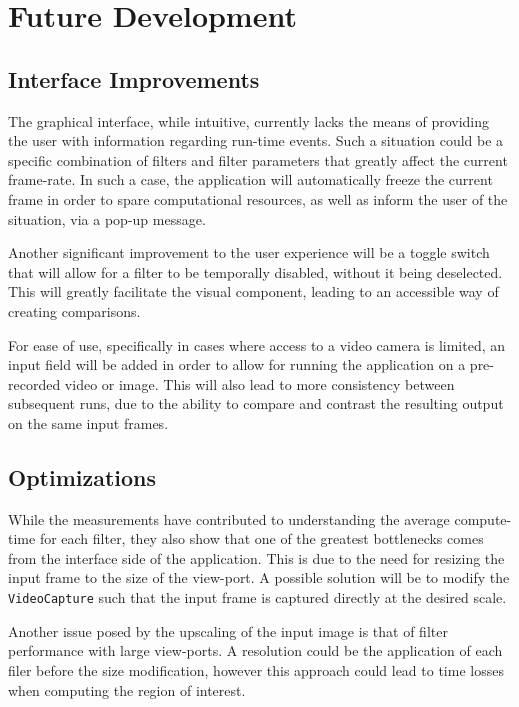 \section{Future Development}

\subsection{Interface Improvements}

The graphical interface, while intuitive, currently lacks the means of providing the user with information
regarding run-time events. Such a situation could be a specific combination of filters and filter parameters
that greatly affect the current frame-rate. In such a case, the application will automatically freeze
the current frame in order to spare computational resources, as well as inform the user of the situation,
via a pop-up message.

Another significant improvement to the user experience will be a toggle switch that will allow for a filter
to be temporally disabled, without it being deselected. This will greatly facilitate the visual component,
leading to an accessible way of creating comparisons.

For ease of use, specifically in cases where access to a video camera is limited, an input field will be 
added in order to allow for running the application on a pre-recorded video or image. This will also lead
to more consistency between subsequent runs, due to the ability to compare and contrast the resulting 
output on the same input frames.

\subsection{Optimizations}

While the measurements have contributed to understanding the average compute-time for each filter, they
also show that one of the greatest bottlenecks comes from the interface side of the application. This is 
due to the need for resizing the input frame to the size of the view-port. A possible solution will be 
to modify the \verb|VideoCapture| such that the input frame is captured directly at the desired scale.

Another issue posed by the upscaling of the input image is that of filter performance with large
view-ports. A resolution could be the application of each filer before the size modification, however
this approach could lead to time losses when computing the region of interest.

